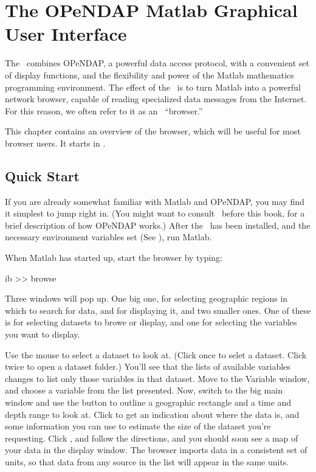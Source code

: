 %
%

\chapter{The OPeNDAP Matlab Graphical User Interface}
\label{gui,intro}

The \GUI\ combines OPeNDAP, a powerful data access protocol, with a
convenient set of display functions, and the flexibility and power of
the Matlab mathematics programming environment.  The effect of the
\GUI\ is to turn Matlab into a powerful network browser, capable of
reading specialized data messages from the Internet. For this reason,
we often refer to it as an \OPD\ ``browser.''

This chapter contains an overview of the browser, which will be useful
for most browser users. It starts in .

\section{Quick Start}
\label{gui,quickstart}

If you are already somewhat familiar with Matlab and OPeNDAP, you may
find it simplest to jump right in.  (You might want to consult 
\OPDquick\ before this book, for a brief description of how OPeNDAP
works.)  After the \GUI\ has been installed,   and the necessary environment variables
set (See ), run Matlab.  


When Matlab has started up, start the browser  by typing:

\begin{vcode}{ib}
>> browse
\end{vcode}

Three windows will pop up.  One big one, for selecting geographic
regions in which to search for data, and for displaying it, and two
smaller ones.  One of these is for selecting datasets to browe or
display, and one for selecting the variables you want to display.

Use the mouse to select a dataset to look at.  (Click once to selet a
dataset.  Click twice to open a dataset folder.)  You'll see that the
lists of available variables changes to list only those variables in
that dataset.  Move to the Variable window, and choose a variable from
the list presented.  Now, switch to the big main window and use the
 button to outline a geographic rectangle and a
time and depth range to look at.  Click  to get an
indication about where the data is, and some information you can use
to estimate the size of the dataset you're requesting.  Click , and follow the directions, and you should soon see a map of
your data in the display window.  The browser imports data in a
consistent set of units, so that data from any source in the list will
appear in the same units.

